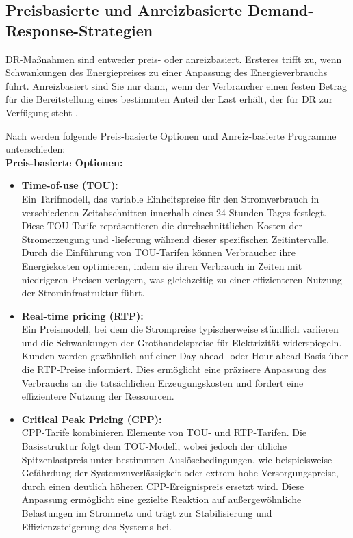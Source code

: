 \subsection{Preisbasierte und Anreizbasierte Demand-Response-Strategien}

DR-Maßnahmen sind entweder preis- oder anreizbasiert. Ersteres trifft zu, wenn Schwankungen des Energiepreises zu einer Anpassung des Energieverbrauchs führt. Anreizbasiert sind Sie nur dann, wenn der Verbraucher einen festen Betrag für die Bereitstellung eines bestimmten Anteil der Last erhält, der für DR zur Verfügung steht \cite{qdrBenefitsDemandResponse2006, grasslEvaluatingMeasuresAdapting2014, vardakasSurveyDemandResponse2014, palenskyDemandSideManagement2011}.

Nach \cite{qdrBenefitsDemandResponse2006} werden folgende Preis-basierte Optionen und Anreiz-basierte Programme unterschieden:\\

\textbf{Preis-basierte Optionen:}
\begin{itemize}[label={--}]
	\item \textbf{Time-of-use (TOU):}\\
	 Ein Tarifmodell, das variable Einheitspreise für den Stromverbrauch in verschiedenen Zeitabschnitten innerhalb eines 24-Stunden-Tages festlegt. Diese TOU-Tarife repräsentieren die durchschnittlichen Kosten der Stromerzeugung und -lieferung während dieser spezifischen Zeitintervalle. Durch die Einführung von TOU-Tarifen können Verbraucher ihre Energiekosten optimieren, indem sie ihren Verbrauch in Zeiten mit niedrigeren Preisen verlagern, was gleichzeitig zu einer effizienteren Nutzung der Strominfrastruktur führt.\\
	 
	\item \textbf{Real-time pricing (RTP):}\\
	Ein Preismodell, bei dem die Strompreise typischerweise stündlich variieren und die Schwankungen der Großhandelspreise für Elektrizität widerspiegeln. Kunden werden gewöhnlich auf einer Day-ahead- oder Hour-ahead-Basis über die RTP-Preise informiert. Dies ermöglicht eine präzisere Anpassung des Verbrauchs an die tatsächlichen Erzeugungskosten und fördert eine effizientere Nutzung der Ressourcen.
	
	\item \textbf{Critical Peak Pricing (CPP):}\\
	CPP-Tarife kombinieren Elemente von TOU- und RTP-Tarifen. Die Basisstruktur folgt dem TOU-Modell, wobei jedoch der übliche Spitzenlastpreis unter bestimmten Auslösebedingungen, wie beispielsweise Gefährdung der Systemzuverlässigkeit oder extrem hohe Versorgungspreise, durch einen deutlich höheren CPP-Ereignispreis ersetzt wird. Diese Anpassung ermöglicht eine gezielte Reaktion auf außergewöhnliche Belastungen im Stromnetz und trägt zur Stabilisierung und Effizienzsteigerung des Systems bei.\\
\end{itemize}

